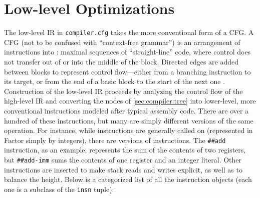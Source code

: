 \section{Low-level Optimizations}\label{sec:compiler:cfg}

The low-level \gls{IR} in \Verb|compiler.cfg| takes the more conventional form
of a \gls{CFG}.  A \gls{CFG} (not to be confused with ``context-free grammar'')
is an arrangement of instructions into : maximal sequences
of ``straight-line'' code, where control does not transfer out of or into the
middle of the block.  Directed edges are added between blocks to represent
control flow---either from a branching instruction to its target, or from the
end of a basic block to the start of the next one \autocite{DragonBook}.
Construction of the low-level \gls{IR} proceeds by analyzing the control flow
of the high-level \gls{IR} and converting the nodes of \cref{sec:compiler:tree}
into lower-level, more conventional instructions modeled after typical assembly
code.  There are over a hundred of these instructions, but many are simply
different versions of the same operation.  For instance, while instructions are
generally called on  (represented in Factor simply by
integers), there are  versions of instructions.  The
\Verb|##add| instruction, as an example, represents the sum of the contents of
two registers, but \Verb|##add-imm| sums the contents of one register and an
integer literal.  Other instructions are inserted to make stack reads and
writes explicit, as well as to balance the height.  Below is a categorized list
of all the instruction objects (each one is a subclass of the \Verb|insn|
tuple).





